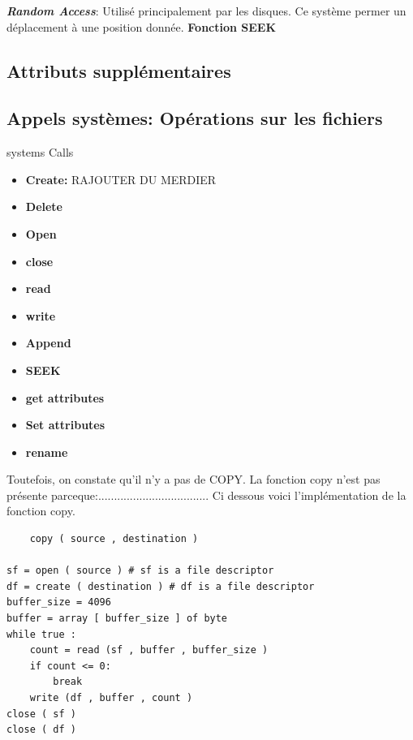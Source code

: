 \textbf{\textit{Random Access}}: Utilisé principalement par les disques. Ce système permer un déplacement à une position donnée. \textbf{Fonction SEEK}
\subsection{Attributs supplémentaires}


\subsection{Appels systèmes: Opérations sur les fichiers}
systems Calls
\begin{itemize}
    \item \textbf{Create: } RAJOUTER DU MERDIER
    \item \textbf{Delete}
    \item \textbf{Open}
    \item \textbf{close}
    \item \textbf{read}
    \item \textbf{write}
    \item \textbf{Append}
    \item \textbf{SEEK}
    \item \textbf{get attributes}
    \item \textbf{Set attributes}
    \item \textbf{rename}

\end{itemize}
Toutefois, on constate qu'il n'y a pas de COPY. La fonction copy n'est pas présente parceque:................................... Ci dessous voici l'implémentation de la fonction copy.\\[.5cm]

\begin{lstlisting}
    copy ( source , destination )

sf = open ( source ) # sf is a file descriptor
df = create ( destination ) # df is a file descriptor
buffer_size = 4096
buffer = array [ buffer_size ] of byte
while true :
    count = read (sf , buffer , buffer_size )
    if count <= 0:
        break
    write (df , buffer , count )
close ( sf )
close ( df )
\end{lstlisting}











